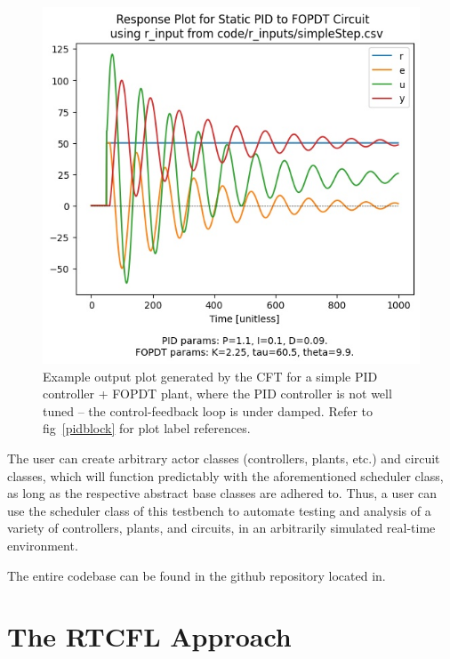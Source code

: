 \documentclass[10pt,twocolumn,letterpaper]{article}
\begin{document}
        \begin{figure}[h]
            \includegraphics[width=\linewidth]{./figures/output_plot_2022Apr25221020.jpg}
            \centering
            \caption{Example output plot generated by the CFT for a simple PID controller + FOPDT plant, where the PID
                controller is not well tuned -- the control-feedback loop is under damped. Refer to fig~\ref{pidblock}
                for plot label references.}
            \label{controllertboutputplot}
        \end{figure}

        The user can create arbitrary actor classes (controllers, plants, etc.) and circuit classes, which will function
        predictably with the aforementioned scheduler class, as long as the respective abstract base classes are adhered
        to. Thus, a user can use the scheduler class of this testbench to automate testing and analysis of a variety of
        controllers, plants, and circuits, in an arbitrarily simulated real-time environment.

        The entire codebase can be found in the github repository located in\cite{gitrepo}.

    \section{The RTCFL Approach} \label{RTCFLexpained}
\end{document}
